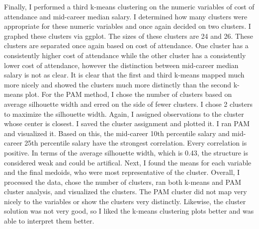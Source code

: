 \documentclass[]{article}
\begin{document}
Finally, I performed a third k-means clustering on the numeric variables
of cost of attendance and mid-career median salary. I determined how
many clusters were appropriate for these numeric variables and once
again decided on two clusters. I graphed these clusters via ggplot. The
sizes of these clusters are 24 and 26. These clusters are separated once
again based on cost of attendance. One cluster has a consistently higher
cost of attendance while the other cluster has a consistently lower cost
of attendance, however the distinction between mid-career median salary
is not as clear. It is clear that the first and third k-means mapped
much more nicely and showed the clusters much more distinctly than the
second k-means plot. For the PAM method, I chose the number of clusters
based on average silhouette width and erred on the side of fewer
clusters. I chose 2 clusters to maximize the silhouette width. Again, I
assigned observations to the cluster whose center is closest. I saved
the cluster assignment and plotted it. I ran PAM and visualized it.
Based on this, the mid-career 10th percentile salary and mid-career 25th
percentile salary have the strongest correlation. Every correlation is
positive. In terms of the average silhouette width, which is 0.43, the
structure is considered weak and could be artifical. Next, I found the
means for each variable and the final medoids, who were most
representative of the cluster. Overall, I processed the data, chose the
number of clusters, ran both k-means and PAM cluster analysis, and
visualized the clusters. The PAM cluster did not map very nicely to the
variables or show the clusters very distinctly. Likewise, the cluster
solution was not very good, so I liked the k-means clustering plots
better and was able to interpret them better.
\end{document}
